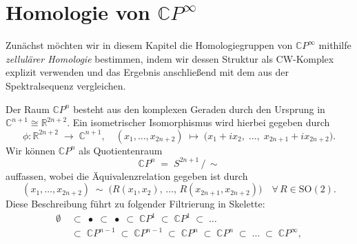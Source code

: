 \documentclass[12pt, hidelinks]{article}
\numberwithin{conj}{section}
\begin{document}
                \section{Homologie von $\mathbb{C}P^\infty$}
                \noindent
                Zunächst möchten wir in diesem Kapitel die Homologiegruppen von \(\mathbb{C}P^\infty\) mithilfe \emph{zellulärer Homologie} bestimmen, indem wir dessen Struktur als CW-Komplex explizit verwenden und das Ergebnis anschließend mit dem aus der Spektralsequenz vergleichen. 
                
                Der Raum \(\mathbb{C}P^n\) besteht aus den komplexen Geraden durch den Ursprung in \(\mathbb{C}^{n+1} \cong \mathbb{R}^{2n+2}\). Ein isometrischer Isomorphismus wird hierbei gegeben durch
                \[
                    \phi \colon \mathbb{R}^{2n+2} \;\longrightarrow\; \mathbb{C}^{n+1},
                    \quad
                    (x_1, \dots, x_{2n+2})
                    \;\mapsto\;
                    \bigl(x_1 + i x_2,\; \dots,\; x_{2n+1} + i x_{2n+2}\bigr).
                \]
                Wir können \(\mathbb{C}P^n\) als Quotientenraum
                \[
                    \mathbb{C}P^n \;=\; S^{2n+1} \,/\,\sim
                \]
                auffassen, wobei die Äquivalenzrelation gegeben ist durch
                \[
                    (x_1, \ldots, x_{2n+2})
                    \;\sim\;
                    \bigl(R(x_1,x_2),\,\dots,\,R(x_{2n+1},x_{2n+2})\bigr)
                    \quad
                    \forall\, R \in \mathrm{SO}(2).
                \]
                Diese Beschreibung führt zu folgender Filtrierung in Skelette:
                \begin{align*}
                    \emptyset
                      & \;\subset\; 
                    \bullet
                    \;\subset\;
                    \bullet
                    \;\subset\;
                    \mathbb{C}P^1
                    \;\subset\;
                    \mathbb{C}P^1
                    \;\subset\;
                    \dots\\
                      & \;\subset\; 
                    \mathbb{C}P^{n-1}
                    \;\subset\;
                    \mathbb{C}P^{n-1}
                    \;\subset\;
                    \mathbb{C}P^n
                    \;\subset\;
                    \mathbb{C}P^n
                    \;\subset\;
                    \dots
                    \;\subset\;
                    \mathbb{C}P^\infty,
                \end{align*}
\end{document}
